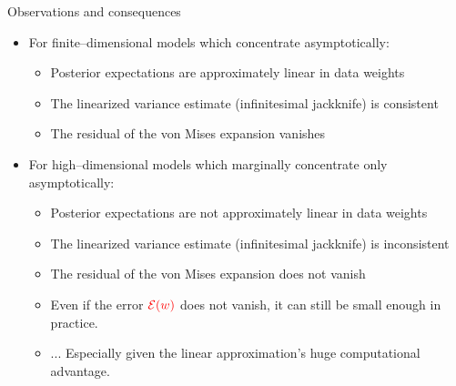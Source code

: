 
\begin{frame}{Observations and consequences}



\begin{itemize}
\item For finite--dimensional models which concentrate asymptotically:
\begin{itemize}
    \item Posterior expectations are approximately linear in data weights
    \item The linearized variance estimate (infinitesimal jackknife) is consistent
    \item The residual of the von Mises expansion vanishes
\end{itemize}
\item For high--dimensional models which marginally concentrate only asymptotically:
\begin{itemize}
    \item Posterior expectations are not approximately linear in data weights
    \item The linearized variance estimate (infinitesimal jackknife) is inconsistent
    \item The residual of the von Mises expansion does not vanish
    \item Even if the error $\textcolor{red}{\mathcal{E}(w)}$ does not vanish,
            it can still be small enough in practice.
    \item[] ... Especially given the linear approximation's huge computational advantage.
\end{itemize}
\end{itemize}


\end{frame}
